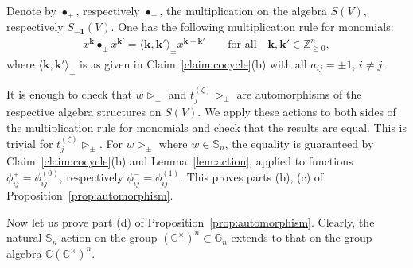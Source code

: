 \documentclass[pdftex]{sigma}
\begin{document}
Denote by $\bullet_+$, respectively $\bullet_-$, the multiplication on the algebra $S(V)$, respectively
$S_{\mathbf{-1}}(V)$.
One has the following multiplication rule for monomials:
\begin{gather*}
x^{\mathbf k}\bullet_\pm x^{\mathbf{k'}} = \langle \mathbf k,\mathbf k'\rangle_\pm x^{\mathbf{k}+\mathbf{k'}}
\qquad
\text{for all}\quad\mathbf{k}, \mathbf{k'}\in \mathbb Z_{\ge 0}^n,
\end{gather*}
where $\langle \mathbf k,\mathbf k'\rangle_\pm$ is as given in Claim~\ref{claim:cocycle}(b) with all $a_{ij}=\pm1$, $i\ne j$.

It is enough to check that $w\mathop{\triangleright}\nolimits_\pm$ and
$t_j^{(\zeta)}\mathop{\triangleright}\nolimits_\pm$ are automorphisms of the respective algebra structures on $S(V)$.
We apply these actions to both sides of the multiplication rule for monomials and check that the results are equal.
This is trivial for $t_j^{(\zeta)}\mathop{\triangleright}\nolimits_\pm$.
For $w\mathop{\triangleright}\nolimits_\pm$ where $w\in \mathbb S_n$,   the equality is guaranteed by
Claim~\ref{claim:cocycle}(b) and Lemma~\ref{lem:action}, applied to functions $\phi_{ij}^+=\phi_{ij}^{(0)}$,
respectively $\phi_{ij}^-=\phi_{ij}^{(1)}$.
This proves parts (b), (c) of Proposition~\ref{prop:automorphism}.

Now let us prove part (d) of Proposition~\ref{prop:automorphism}.
Clearly, the natural $\mathbb S_n$-action on the group $(\mathbb C^\times)^ n\subset \mathbb G_n$ extends to that on the
group algebra $\mathbb C (\mathbb C^\times)^n$.
\end{document}
